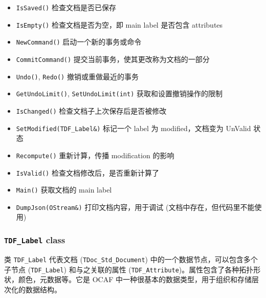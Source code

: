 \documentclass[11pt]{article}
\begin{document}
\begin{itemize}
\item \texttt{IsSaved()} 检查文档是否已保存
\item \texttt{IsEmpty()} 检查文档是否为空，即 main label 是否包含 attributes
\item \texttt{NewCommand()} 启动一个新的事务或命令
\item \texttt{CommitCommand()} 提交当前事务，使其更改称为文档的一部分
\item \texttt{Undo()}, \texttt{Redo()} 撤销或重做最近的事务
\item \texttt{GetUndoLimit()}, \texttt{SetUndoLimit(int)} 获取和设置撤销操作的限制
\item \texttt{IsChanged()} 检查文档子上次保存后是否被修改
\item \texttt{SetModified(TDF\_Label\&)} 标记一个 label 为 modified，文档变为 UnValid 状态
\item \texttt{Recompute()} 重新计算，传播 modification 的影响
\item \texttt{IsValid()} 检查文档修改后，是否重新计算了
\item \texttt{Main()} 获取文档的 main label
\item \texttt{DumpJson(OStream\&)} 打印文档内容，用于调试 (文档中存在，但代码里不能使用)
\end{itemize}
\subsubsection{\texttt{TDF\_Label} class}
\label{sec:org938943d}

类 \texttt{TDF\_Label} 代表文档 (\texttt{TDoc\_Std\_Document}) 中的一个数据节点，可以包含多个子节点 (\texttt{TDF\_Label}) 和与之关联的属性 (\texttt{TDF\_Attribute})。属性包含了各种拓扑形状，颜色，元数据等。它是 OCAF 中一种很基本的数据类型，用于组织和存储层次化的数据结构。
\end{document}
